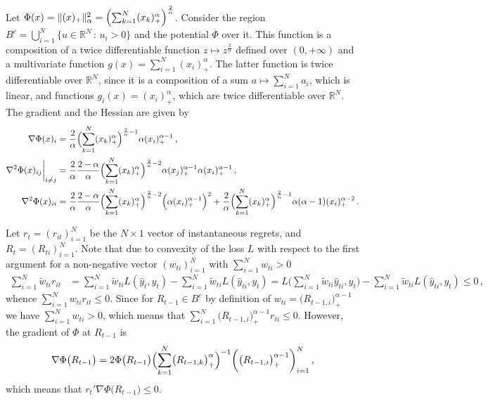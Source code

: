 \documentclass[a4paper]{article}
\newcommand{\Real}{\mathbb{R}}
\begin{document}
Let $\Phi(x) = \|(x)_+\|_\alpha^2 = \Bigl(\sum_{k=1}^N (x_k)_+^\alpha\Bigr)^\frac{2}{\alpha}$.
Consider the region $B^c=\bigcup_{i=1}^N \{u\in \Real^N\,:\, u_i > 0\}$ and the
potential $\Phi$ over it. This function is a composition of a twice differentiable
function $z\mapsto z^\frac{2}{\alpha}$ defined over $(0, +\infty)$ and a multivariate
function $g(x) = \sum_{i=1}^N (x_i)_+^\alpha$. The latter function is twice differentiable
over $\Real^N$, since it is a composition of a sum $a\mapsto \sum_{i=1}^N a_i$, which
is linear, and functions $g_i(x) = (x_i)_+^\alpha$, which are twice differentiable
over $\Real^N$. The gradient and the Hessian are given by
\begin{align*}
  \nabla \Phi(x)_i
    &= \frac{2}{\alpha}
      \Bigl(\sum_{k=1}^N (x_k)_+^\alpha\Bigr)^{\frac{2}{\alpha} - 1}
        \alpha (x_i)_+^{\alpha-1} \,, \\
  \biggl. \nabla^2 \Phi(x)_{ij} \biggr\rvert_{i\neq j}
    &= \frac{2}{\alpha}\frac{2 - \alpha}{\alpha}
      \Bigl(\sum_{k=1}^N (x_k)_+^\alpha\Bigr)^{\frac{2}{\alpha} - 2}
        \alpha (x_j)_+^{\alpha-1} \alpha (x_i)_+^{\alpha-1} \,, \\
  \nabla^2 \Phi(x)_{ii}
    &= \frac{2}{\alpha}\frac{2 - \alpha}{\alpha}
      \Bigl(\sum_{k=1}^N (x_k)_+^\alpha\Bigr)^{\frac{2}{\alpha} - 2}
        \Bigl(\alpha (x_i)_+^{\alpha-1}\Bigr)^2
    + \frac{2}{\alpha}
      \Bigl(\sum_{k=1}^N (x_k)_+^\alpha\Bigr)^{\frac{2}{\alpha} - 1}
        \alpha (\alpha - 1) (x_i)_+^{\alpha-2} \,.
\end{align*}

Let $r_t=(r_{it})_{i=1}^N$ be the $N\times 1$ vector of instantaneous regrets, and
$R_t = (R_{ti})_{i=1}^N$. Note that due to convexity of the loss $L$ with respect
to the first argument for a non-negative vector $(w_{ti})_{i=1}^N$ with $\sum_{i=1}^N w_{ti}>0$
\begin{align*}
  \sum_{i=1}^N \tilde{w}_{ti} r_{it}
    &= \sum_{i=1}^N \tilde{w}_{ti} L(\hat{y}_t, y_t)
     - \sum_{i=1}^N \tilde{w}_{ti} L(\hat{y}_{ti}, y_t)
     = L\bigl(\sum_{i=1}^N \tilde{w}_{ti} \hat{y}_{ti}, y_t\bigr)
     - \sum_{i=1}^N \tilde{w}_{ti} L(\hat{y}_{ti}, y_t)
     \leq 0 \,,
\end{align*}
whence $\sum_{i=1}^N w_{ti} r_{it} \leq 0$. Since for $R_{t-1}\in B^c$ by definition
of $w_{ti} = \bigl(R_{t-1,i}\bigr)_+^{\alpha-1}$ we have $\sum_{i=1}^N w_{ti}>0$, which
means that $\sum_{i=1}^N \bigl(R_{t-1,i}\bigr)_+^{\alpha-1} r_{ti} \leq 0$. However,
the gradient of $\Phi$ at $R_{t-1}$ is 
\begin{equation}
  \nabla \Phi\bigl(R_{t-1}\bigr)
    = 2 \Phi\bigl(R_{t-1}\bigr)
      \Bigl(\sum_{k=1}^N \bigl(R_{t-1,k}\bigr)_+^\alpha\Bigr)^{-1}
      \biggl(\bigl(R_{t-1,i}\bigr)_+^{\alpha-1}\biggr)_{i=1}^N \,,
\end{equation}
which means that $r_t' \nabla \Phi\bigl(R_{t-1}\bigr)\leq 0$.
\end{document}
